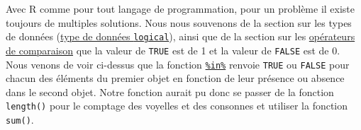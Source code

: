 \documentclass[]{book}
\newenvironment{Shaded}{\begin{snugshade}}{\end{snugshade}}
\newcommand{\CommentTok}[1]{\textcolor[rgb]{0.56,0.35,0.01}{\textit{#1}}}
\newcommand{\ControlFlowTok}[1]{\textcolor[rgb]{0.13,0.29,0.53}{\textbf{#1}}}
\newcommand{\DataTypeTok}[1]{\textcolor[rgb]{0.13,0.29,0.53}{#1}}
\newcommand{\DecValTok}[1]{\textcolor[rgb]{0.00,0.00,0.81}{#1}}
\newcommand{\KeywordTok}[1]{\textcolor[rgb]{0.13,0.29,0.53}{\textbf{#1}}}
\newcommand{\NormalTok}[1]{#1}
\newcommand{\OperatorTok}[1]{\textcolor[rgb]{0.81,0.36,0.00}{\textbf{#1}}}
\newcommand{\StringTok}[1]{\textcolor[rgb]{0.31,0.60,0.02}{#1}}
\begin{document}
Avec R comme pour tout langage de programmation, pour un problème il existe toujours de multiples solutions. Nous nous souvenons de la section sur les types de données (\protect\hyperlink{l013logi}{type de données \texttt{logical}}), ainsi que de la section sur les \protect\hyperlink{l011opcomp}{opérateurs de comparaison} que la valeur de \texttt{TRUE} est de 1 et la valeur de \texttt{FALSE} est de 0. Nous venons de voir ci-dessus que la fonction \protect\hyperlink{l015in}{\texttt{\%in\%}} renvoie \texttt{TRUE} ou \texttt{FALSE} pour chacun des éléments du premier objet en fonction de leur présence ou absence dans le second objet. Notre fonction aurait pu donc se passer de la fonction \texttt{length()} pour le comptage des voyelles et des consonnes et utiliser la fonction \texttt{sum()}.

\begin{Shaded}
\end{Shaded}
\end{document}

